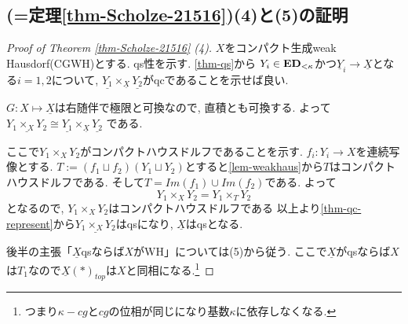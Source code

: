 \documentclass[dvipdfmx,a4paper,11pt]{article}
\theoremstyle{definition}
\begin{document}
\subsection{\cite[Proposition 2.15, Theorem 2.16]{Sch19}(=定理\ref{thm-Scholze-21516})(4)と(5)の証明}

\begin{proof}[Proof of Theorem \ref{thm-Scholze-21516} (4)]

$X$をコンパクト生成weak Hausdorf(CGWH)とする.
qs性を示す. \ref{thm-qs}から
$Y_i \in {\bf ED}_{< \kappa}$かつ$\underline{Y}_{i} \to \underline{X}$となる$i=1,2$について, 
$\underline{Y_1} \times_{\underline{X}} \underline{Y_2}$がqcであることを示せば良い. 

$G : X \mapsto \underline{X} $は右随伴で極限と可換なので, 直積とも可換する.
よって
$\underline{Y_1 \times_{X} Y_2} \cong \underline{Y_1} \times_{\underline{X}} \underline{Y_2}$
である.

ここで$Y_1 \times_{X} Y_2$がコンパクトハウスドルフであることを示す. 
$f_i : Y_i \to X$を連続写像とする. 
$T := (f_1 \sqcup f_2)(Y_1 \sqcup Y_2)$とすると\ref{lem-weakhaus}から$T$はコンパクトハウスドルフである.
そして$T = Im(f_1) \cup Im(f_2)$である. 
よって
$$
Y_1 \times_{X} Y_2 = Y_1 \times_{T} Y_2
$$
となるので, $Y_1 \times_{X} Y_2$はコンパクトハウスドルフである
以上より\ref{thm-qc-represent}から$\underline{Y_1 \times_{X} Y_2}$はqsになり, $\underline{X}$はqsとなる. 

後半の主張「$\underline{X}$qsならば$X$がWH」については(5)から従う. 
ここで$\underline{X}$がqsならば$X$は$T_1$なので$\underline{X}(\ast)_{top} $は$X$と同相になる.\footnote{つまり$\kappa-cg$と$cg$の位相が同じになり基数$\kappa$に依存しなくなる. } 

\end{proof}
\end{document}

